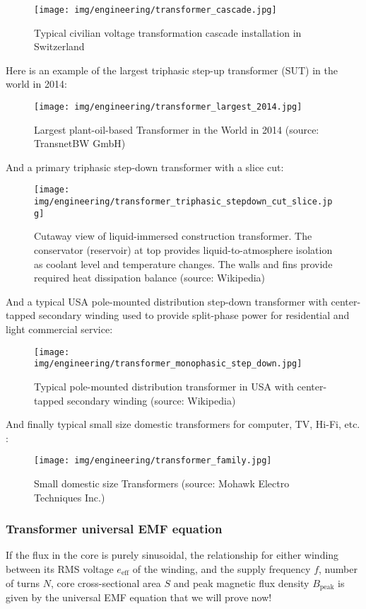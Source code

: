 	\begin{figure}[H]
		\centering
		\texttt{[image: img/engineering/transformer\_cascade.jpg]}
		\caption{Typical civilian voltage transformation cascade installation in Switzerland}
	\end{figure}
	\pagebreak
	Here is an example of the largest triphasic step-up transformer (SUT) in the world in 2014:
	\begin{figure}[H]
		\centering
		\texttt{[image: img/engineering/transformer\_largest\_2014.jpg]}
		\caption{Largest plant-oil-based Transformer in the World in 2014 (source: TransnetBW GmbH)}
	\end{figure}
	And a primary triphasic step-down transformer with a slice cut:
	\begin{figure}[H]
		\centering
		\texttt{[image: img/engineering/transformer\_triphasic\_stepdown\_cut\_slice.jpg]}
		\caption{Cutaway view of liquid-immersed construction transformer. The conservator (reservoir) at top provides liquid-to-atmosphere isolation as coolant level and temperature changes. The walls and fins provide required heat dissipation balance (source: Wikipedia)}
	\end{figure}
	And a typical USA pole-mounted distribution step-down transformer  with center-tapped secondary winding used to provide split-phase power for residential and light commercial service:
	\begin{figure}[H]
		\centering
		\texttt{[image: img/engineering/transformer\_monophasic\_step\_down.jpg]}
		\caption{Typical pole-mounted distribution transformer in USA with center-tapped secondary winding (source: Wikipedia)}
	\end{figure}
	And finally typical small size domestic transformers for computer, TV, Hi-Fi, etc. :
	\begin{figure}[H]
		\centering
		\texttt{[image: img/engineering/transformer\_family.jpg]}
		\caption{Small domestic size Transformers (source: Mohawk Electro Techniques Inc.)}
	\end{figure}
	
	\subsubsection{Transformer universal EMF equation}
	If the flux in the core is purely sinusoidal, the relationship for either winding between its RMS voltage $e_\text{eff}$ of the winding, and the supply frequency $f$, number of turns $N$, core cross-sectional area $S$ and peak magnetic flux density $B_\text{peak}$ is given by the universal EMF equation that we will prove now!
	

